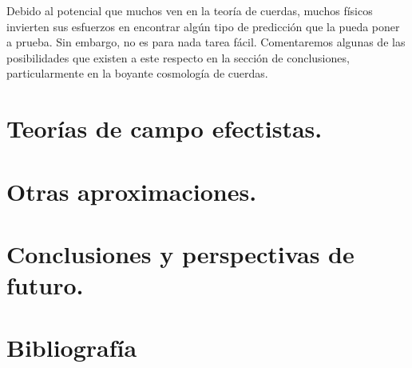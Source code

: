 \documentclass[11pt,a4paper,titlepage]{article}
\begin{document}
Debido al potencial que muchos ven en la teoría de cuerdas, muchos físicos invierten sus esfuerzos en encontrar algún tipo de predicción que la pueda poner a prueba. Sin embargo, no es para nada tarea fácil. Comentaremos algunas de las posibilidades que existen a este respecto en la sección de conclusiones, particularmente en la boyante cosmología de cuerdas.

%
%
%
%
\newpage
\section{Teorías de campo efectistas.} %

%
%
%
%
\newpage
\section{Otras aproximaciones.} %

%
%
%
%
\newpage
\section{Conclusiones y perspectivas de futuro.} %


%
%
%
%
\section{Bibliografía}


\nocite{*}
\end{document}
